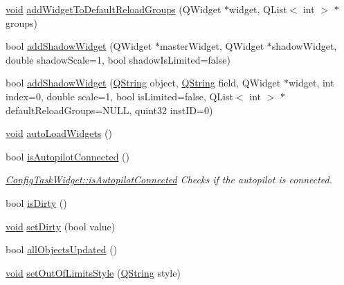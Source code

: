 \begin{DoxyCompactItemize}
\item 
\hyperlink{group___u_a_v_objects_plugin_ga444cf2ff3f0ecbe028adce838d373f5c}{void} \hyperlink{group___u_a_v_object_widget_utils_gabdd18a22aae23df220d48868ecbdf3a0}{add\-Widget\-To\-Default\-Reload\-Groups} (\-Q\-Widget $\ast$widget, \-Q\-List$<$ int $>$ $\ast$groups)
\item 
bool \hyperlink{group___u_a_v_object_widget_utils_ga726f8720d2d1bb52d38a6425fbfab448}{add\-Shadow\-Widget} (\-Q\-Widget $\ast$master\-Widget, \-Q\-Widget $\ast$shadow\-Widget, double shadow\-Scale=1, bool shadow\-Is\-Limited=false)
\item 
bool \hyperlink{group___u_a_v_object_widget_utils_ga285c7e48c6b730133169c0226cbc59c4}{add\-Shadow\-Widget} (\hyperlink{group___u_a_v_objects_plugin_gab9d252f49c333c94a72f97ce3105a32d}{\-Q\-String} object, \hyperlink{group___u_a_v_objects_plugin_gab9d252f49c333c94a72f97ce3105a32d}{\-Q\-String} field, \-Q\-Widget $\ast$widget, int index=0, double scale=1, bool is\-Limited=false, \-Q\-List$<$ int $>$ $\ast$default\-Reload\-Groups=\-N\-U\-L\-L, quint32 inst\-I\-D=0)
\item 
\hyperlink{group___u_a_v_objects_plugin_ga444cf2ff3f0ecbe028adce838d373f5c}{void} \hyperlink{group___u_a_v_object_widget_utils_ga945551d9d4d280fe2cd14bc2646d8fbf}{auto\-Load\-Widgets} ()
\item 
bool \hyperlink{group___u_a_v_object_widget_utils_gad61b70a01e85822c5838c2c5833c22fd}{is\-Autopilot\-Connected} ()
\begin{DoxyCompactList}\small\item\em \hyperlink{group___u_a_v_object_widget_utils_gad61b70a01e85822c5838c2c5833c22fd}{\-Config\-Task\-Widget\-::is\-Autopilot\-Connected} \-Checks if the autopilot is connected. \end{DoxyCompactList}\item 
bool \hyperlink{group___u_a_v_object_widget_utils_ga2d7e19cef57df7b30741b4901b5a190f}{is\-Dirty} ()
\item 
\hyperlink{group___u_a_v_objects_plugin_ga444cf2ff3f0ecbe028adce838d373f5c}{void} \hyperlink{group___u_a_v_object_widget_utils_gae75127fbfffe10458defc31a6a18c0f8}{set\-Dirty} (bool value)
\item 
bool \hyperlink{group___u_a_v_object_widget_utils_ga62e7277f3b8228d44da13a2355b96e9a}{all\-Objects\-Updated} ()
\item 
\hyperlink{group___u_a_v_objects_plugin_ga444cf2ff3f0ecbe028adce838d373f5c}{void} \hyperlink{group___u_a_v_object_widget_utils_gaefefd74c41c3c7655ae047ae80d6dba8}{set\-Out\-Of\-Limits\-Style} (\hyperlink{group___u_a_v_objects_plugin_gab9d252f49c333c94a72f97ce3105a32d}{\-Q\-String} style)

\end{DoxyCompactItemize}
